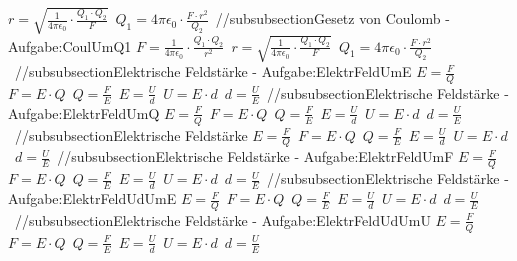 $ r = \sqrt{\frac{  1}{4\pi \epsilon _{0} } \cdot  \frac{Q_{1} \cdot Q_{2} }{  F}} $\ 
$ Q_{1}  = 4\pi \epsilon _{0}  \cdot  \frac{F\cdot r^{2} }{ Q_{2} } $\ 
//subsubsection{Gesetz von Coulomb - Aufgabe:CoulUmQ1} 
$ F = \frac{ 1}{4\pi \epsilon _{0} } \cdot  \frac{Q_{1} \cdot Q_{2} }{  r^{2} } $\ 
$ r = \sqrt{\frac{  1}{4\pi \epsilon _{0} } \cdot  \frac{Q_{1} \cdot Q_{2} }{  F}} $\ 
$ Q_{1}  = 4\pi \epsilon _{0}  \cdot  \frac{F\cdot r^{2} }{ Q_{2} } $\ 
//subsubsection{Elektrische Feldstärke - Aufgabe:ElektrFeldUmE} 
$ E = \frac{F}{Q} $\ 
$ F = E\cdot Q $\ 
$ Q = \frac{F}{E} $\ 
$ E = \frac{U}{d} $\ 
$ U = E\cdot d $\ 
$ d = \frac{U}{E} $\ 
//subsubsection{Elektrische Feldstärke - Aufgabe:ElektrFeldUmQ} 
$ E = \frac{F}{Q} $\ 
$ F = E\cdot Q $\ 
$ Q = \frac{F}{E} $\ 
$ E = \frac{U}{d} $\ 
$ U = E\cdot d $\ 
$ d = \frac{U}{E} $\ 
//subsubsection{Elektrische Feldstärke} 
$ E = \frac{F}{Q} $\ 
$ F = E\cdot Q $\ 
$ Q = \frac{F}{E} $\ 
$ E = \frac{U}{d} $\ 
$ U = E\cdot d $\ 
$ d = \frac{U}{E} $\ 
//subsubsection{Elektrische Feldstärke - Aufgabe:ElektrFeldUmF} 
$ E = \frac{F}{Q} $\ 
$ F = E\cdot Q $\ 
$ Q = \frac{F}{E} $\ 
$ E = \frac{U}{d} $\ 
$ U = E\cdot d $\ 
$ d = \frac{U}{E} $\ 
//subsubsection{Elektrische Feldstärke - Aufgabe:ElektrFeldUdUmE} 
$ E = \frac{F}{Q} $\ 
$ F = E\cdot Q $\ 
$ Q = \frac{F}{E} $\ 
$ E = \frac{U}{d} $\ 
$ U = E\cdot d $\ 
$ d = \frac{U}{E} $\ 
//subsubsection{Elektrische Feldstärke - Aufgabe:ElektrFeldUdUmU} 
$ E = \frac{F}{Q} $\ 
$ F = E\cdot Q $\ 
$ Q = \frac{F}{E} $\ 
$ E = \frac{U}{d} $\ 
$ U = E\cdot d $\ 
$ d = \frac{U}{E} $\ 
